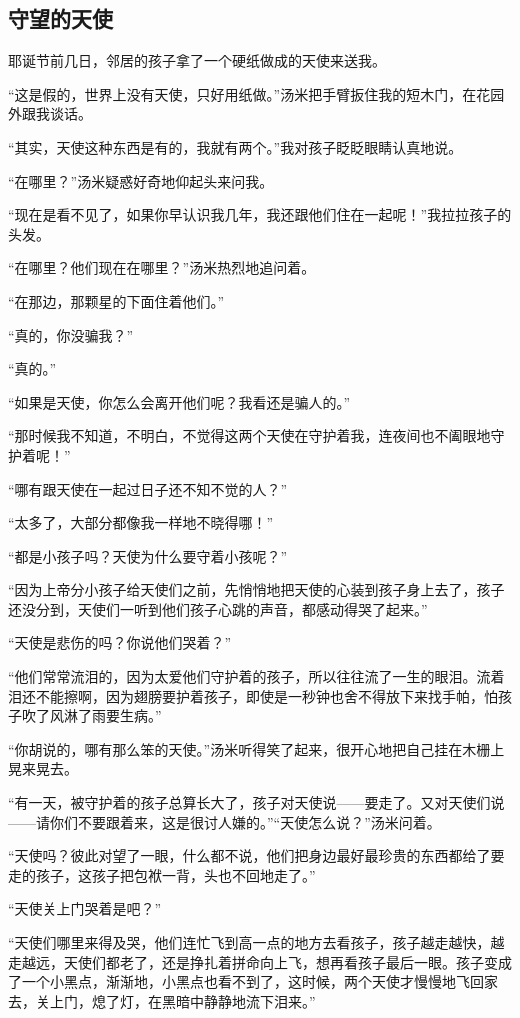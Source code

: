 \subsection{守望的天使}


\par 耶诞节前几日，邻居的孩子拿了一个硬纸做成的天使来送我。
\par “这是假的，世界上没有天使，只好用纸做。”汤米把手臂扳住我的短木门，在花园外跟我谈话。
\par “其实，天使这种东西是有的，我就有两个。”我对孩子眨眨眼睛认真地说。
\par “在哪里？”汤米疑惑好奇地仰起头来问我。
\par “现在是看不见了，如果你早认识我几年，我还跟他们住在一起呢！”我拉拉孩子的头发。
\par “在哪里？他们现在在哪里？”汤米热烈地追问着。
\par “在那边，那颗星的下面住着他们。”
\par “真的，你没骗我？”
\par “真的。”
\par “如果是天使，你怎么会离开他们呢？我看还是骗人的。”
\par “那时候我不知道，不明白，不觉得这两个天使在守护着我，连夜间也不阖眼地守护着呢！”
\par “哪有跟天使在一起过日子还不知不觉的人？”
\par “太多了，大部分都像我一样地不晓得哪！”
\par “都是小孩子吗？天使为什么要守着小孩呢？”
\par “因为上帝分小孩子给天使们之前，先悄悄地把天使的心装到孩子身上去了，孩子还没分到，天使们一听到他们孩子心跳的声音，都感动得哭了起来。”
\par “天使是悲伤的吗？你说他们哭着？”
\par “他们常常流泪的，因为太爱他们守护着的孩子，所以往往流了一生的眼泪。流着泪还不能擦啊，因为翅膀要护着孩子，即使是一秒钟也舍不得放下来找手帕，怕孩子吹了风淋了雨要生病。”
\par “你胡说的，哪有那么笨的天使。”汤米听得笑了起来，很开心地把自己挂在木栅上晃来晃去。
\par “有一天，被守护着的孩子总算长大了，孩子对天使说——要走了。又对天使们说——请你们不要跟着来，这是很讨人嫌的。”“天使怎么说？”汤米问着。
\par “天使吗？彼此对望了一眼，什么都不说，他们把身边最好最珍贵的东西都给了要走的孩子，这孩子把包袱一背，头也不回地走了。”
\par “天使关上门哭着是吧？”
\par “天使们哪里来得及哭，他们连忙飞到高一点的地方去看孩子，孩子越走越快，越走越远，天使们都老了，还是挣扎着拼命向上飞，想再看孩子最后一眼。孩子变成了一个小黑点，渐渐地，小黑点也看不到了，这时候，两个天使才慢慢地飞回家去，关上门，熄了灯，在黑暗中静静地流下泪来。”
